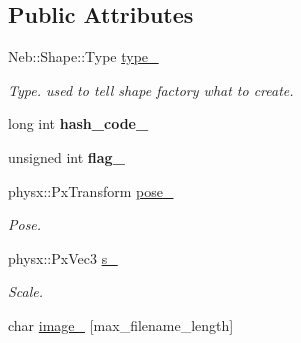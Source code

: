 \subsection*{\-Public \-Attributes}
\begin{DoxyCompactItemize}
\item 
\hypertarget{classNeb_1_1Shape_1_1Raw_a5957d1e0e9878dd9dfa44f0fc8c82b7b}{\-Neb\-::\-Shape\-::\-Type \hyperlink{classNeb_1_1Shape_1_1Raw_a5957d1e0e9878dd9dfa44f0fc8c82b7b}{type\-\_\-}}\label{classNeb_1_1Shape_1_1Raw_a5957d1e0e9878dd9dfa44f0fc8c82b7b}

\begin{DoxyCompactList}\small\item\em \-Type. used to tell shape factory what to create. \end{DoxyCompactList}\item 
\hypertarget{classNeb_1_1Shape_1_1Raw_a51367c2d4bd4fd212a3be66cd485c955}{long int {\bfseries hash\-\_\-code\-\_\-}}\label{classNeb_1_1Shape_1_1Raw_a51367c2d4bd4fd212a3be66cd485c955}

\item 
\hypertarget{classNeb_1_1Shape_1_1Raw_a82ad86a170c5280bc618f79759d28395}{unsigned int {\bfseries flag\-\_\-}}\label{classNeb_1_1Shape_1_1Raw_a82ad86a170c5280bc618f79759d28395}

\item 
\hypertarget{classNeb_1_1Shape_1_1Raw_a4cc2fcb9e81c238a3d500db1b5d20f9f}{physx\-::\-Px\-Transform \hyperlink{classNeb_1_1Shape_1_1Raw_a4cc2fcb9e81c238a3d500db1b5d20f9f}{pose\-\_\-}}\label{classNeb_1_1Shape_1_1Raw_a4cc2fcb9e81c238a3d500db1b5d20f9f}

\begin{DoxyCompactList}\small\item\em \-Pose. \end{DoxyCompactList}\item 
\hypertarget{classNeb_1_1Shape_1_1Raw_a19f3eea941f04510b8b9dfcc38d453aa}{physx\-::\-Px\-Vec3 \hyperlink{classNeb_1_1Shape_1_1Raw_a19f3eea941f04510b8b9dfcc38d453aa}{s\-\_\-}}\label{classNeb_1_1Shape_1_1Raw_a19f3eea941f04510b8b9dfcc38d453aa}

\begin{DoxyCompactList}\small\item\em \-Scale. \end{DoxyCompactList}\item 
\hypertarget{classNeb_1_1Shape_1_1Raw_ac868d3e6b52bd1cdca2a19d21e9d030c}{char \hyperlink{classNeb_1_1Shape_1_1Raw_ac868d3e6b52bd1cdca2a19d21e9d030c}{image\-\_\-} \mbox{[}max\-\_\-filename\-\_\-length\mbox{]}}\label{classNeb_1_1Shape_1_1Raw_ac868d3e6b52bd1cdca2a19d21e9d030c}


\end{DoxyCompactItemize}
